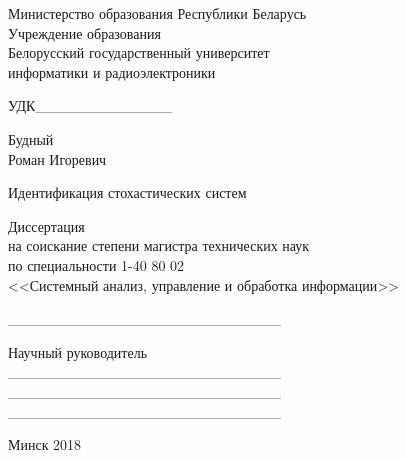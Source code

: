 \setlength{\parindent}{0mm} %
{\centering
  Министерство образования Республики Беларусь \\
  \smallskip
  Учреждение образования \\
  Белорусский государственный университет \\
  информатики и радиоэлектроники \\
}

\vspace{2\baselineskip}
УДК\_\_\_\_\_\_\_\_\_\_\_\_\_

\vspace{4\baselineskip}
{\centering
  Будный \\ Роман Игоревич

  \vspace{3\baselineskip}
  Идентификация стохастических систем

  \bigskip
  Диссертация \\
  на соискание степени магистра технических наук \\
  по специальности 1-40 80 02 \\
  <<Системный анализ, управление и обработка информации>> \\
}

\vspace{2\baselineskip}
\begin{minipage}{.45\linewidth}
\end{minipage}
\hfill
\begin{minipage}{.45\linewidth}
  \_\_\_\_\_\_\_\_\_\_\_\_\_\_\_\_\_\_\_\_\_\_\_\_\_\_

  \bigskip
  Научный руководитель \\
  \_\_\_\_\_\_\_\_\_\_\_\_\_\_\_\_\_\_\_\_\_\_\_\_\_\_ \\
  \_\_\_\_\_\_\_\_\_\_\_\_\_\_\_\_\_\_\_\_\_\_\_\_\_\_ \\
  \_\_\_\_\_\_\_\_\_\_\_\_\_\_\_\_\_\_\_\_\_\_\_\_\_\_
\end{minipage}

\vfill
{\centering Минск 2018 \\}
\thispagestyle{empty}
\pagebreak
\setlength{\parindent}{1.25cm} %